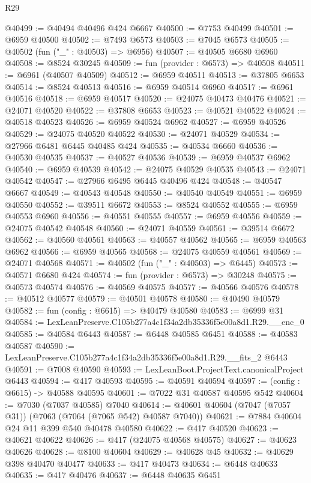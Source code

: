 \begin{lexlean}{R29}
\begin{coremodule}
@40499 := @40494 @40496 @424 @6667
@40500 := @7753 @40499
@40501 := @6959 @40500
@40502 := @7493 @6573
@40503 := @7045 @6573
@40505 := @40502 (fun ("_" : @40503) => @6956)
@40507 := @40505 @6680 @6960
@40508 := @8524 @30245
@40509 := fun (provider : @6573) => @40508
@40511 := @6961 (@40507 @40509)
@40512 := @6959 @40511
@40513 := @37805 @6653
@40514 := @8524 @40513
@40516 := @6959 @40514 @6960
@40517 := @6961 @40516
@40518 := @6959 @40517
@40520 := @24075 @40473 @40476
@40521 := @24071 @40520
@40522 := @37808 @6653
@40523 := @40521 @40522
@40524 := @40518 @40523
@40526 := @6959 @40524 @6962
@40527 := @6959 @40526
@40529 := @24075 @40520 @40522
@40530 := @24071 @40529
@40534 := @27966 @6481 @6445 @40485 @424
@40535 := @40534 @6660
@40536 := @40530 @40535
@40537 := @40527 @40536
@40539 := @6959 @40537 @6962
@40540 := @6959 @40539
@40542 := @24075 @40529 @40535
@40543 := @24071 @40542
@40547 := @27966 @6495 @6445 @40496 @424
@40548 := @40547 @6667
@40549 := @40543 @40548
@40550 := @40540 @40549
@40551 := @6959 @40550
@40552 := @39511 @6672
@40553 := @8524 @40552
@40555 := @6959 @40553 @6960
@40556 := @40551 @40555
@40557 := @6959 @40556
@40559 := @24075 @40542 @40548
@40560 := @24071 @40559
@40561 := @39514 @6672
@40562 := @40560 @40561
@40563 := @40557 @40562
@40565 := @6959 @40563 @6962
@40566 := @6959 @40565
@40568 := @24075 @40559 @40561
@40569 := @24071 @40568
@40571 := @40502 (fun ("_" : @40503) => @6445)
@40573 := @40571 @6680 @424
@40574 := fun (provider : @6573) => @30248
@40575 := @40573 @40574
@40576 := @40569 @40575
@40577 := @40566 @40576
@40578 := @40512 @40577
@40579 := @40501 @40578
@40580 := @40490 @40579
@40582 := fun (config : @6615) => @40479 @40580
@40583 := @6999 @31
@40584 := LexLeanPreserve.C105b277a4c1f34a2db35336f5e00a8d1.R29.__enc_0
@40585 := @40584 @6443
@40587 := @6448 @40585 @6451
@40588 := @40583 @40587
@40590 := LexLeanPreserve.C105b277a4c1f34a2db35336f5e00a8d1.R29.__fits_2 @6443
@40591 := @7008 @40590
@40593 := LexLeanBoot.ProjectText.canonicalProject @6443
@40594 := @417 @40593
@40595 := @40591 @40594
@40597 := (config : @6615) -> @40588 @40595
@40601 := @7022 @31 @40587 @40595 @542
@40604 := @7030 (@7037 @40585) @7040
@40614 := @40601 @40604 (@7047 (@7057 @31)) (@7063 (@7064 (@7065 @542) @40587 @7040))
@40621 := @7884 @40604 @24 @11 @399 @540 @40478 @40580
@40622 := @417 @40520
@40623 := @40621 @40622
@40626 := @417 (@24075 @40568 @40575)
@40627 := @40623 @40626
@40628 := @8100 @40604
@40629 := @40628 @45
@40632 := @40629 @398 @40470 @40477
@40633 := @417 @40473
@40634 := @6448 @40633
@40635 := @417 @40476
@40637 := @6448 @40635 @6451

\end{coremodule}
\end{lexlean}
